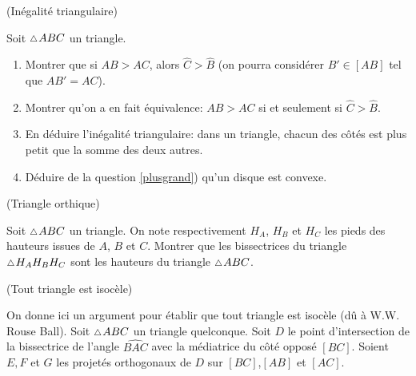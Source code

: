 \documentclass[a4paper,11pt,reqno]{amsart}
\begin{document}
\begin{exo} (Inégalité triangulaire)

  Soit $\tri ABC$ un triangle.
  \begin{enumerate}
    \item \label{plusgrand} Montrer que si $AB > AC$, alors $\widehat{C}>\widehat{B}$ (on pourra considérer $B' \in [AB]$ tel que $AB'=AC$). %
    \item Montrer qu'on a en fait équivalence: $AB>AC$ si et seulement si $\widehat{C}>\widehat{B}$.
    \item En déduire l'inégalité triangulaire: dans un triangle, chacun des côtés est plus petit que la somme des deux autres.
    \item Déduire de la question \ref{plusgrand}) qu'un disque est convexe.
  \end{enumerate}
\end{exo}


\begin{exo}[.7] (Triangle orthique)

  Soit $\tri ABC$ un triangle. On note respectivement $H_A$, $H_B$ et $H_C$ les pieds des hauteurs issues de $A$, $B$ et $C$. Montrer que les bissectrices du triangle $\tri H_AH_BH_C$ sont les hauteurs du triangle $\tri ABC$.
\end{exo}

\begin{exo} (Tout triangle est isocèle)

  On donne ici un argument pour établir que tout triangle est isocèle (dû à W.W. Rouse Ball).
  Soit $\tri ABC$ un triangle quelconque. Soit $D$ le point d'intersection de la bissectrice de l'angle $\widehat{BAC}$ avec la médiatrice du côté opposé $[BC]$. Soient $E,F$ et $G$ les projetés orthogonaux de $D$ sur $[BC]$,$[AB]$ et $[AC]$.\baselineskip
\end{exo}
\end{document}
